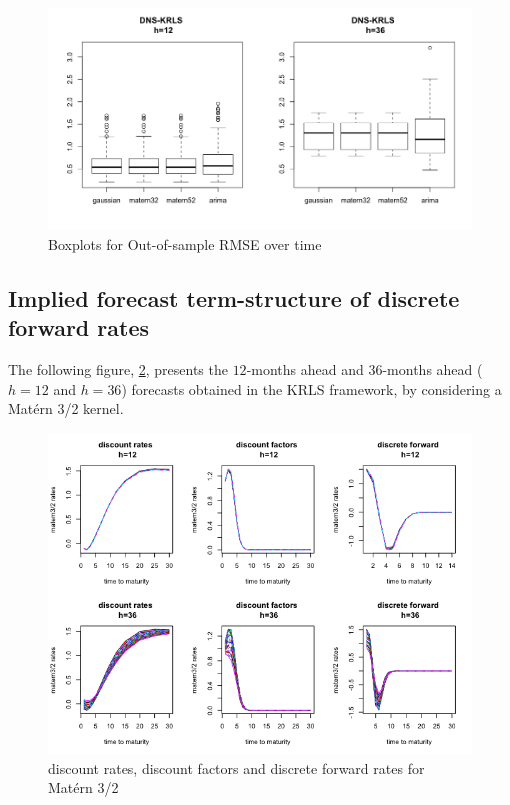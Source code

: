\begin{figure}[!htb]
\centering
\includegraphics[width=12cm]{gfx/chapter-krls-models/oos_rmse_dns_krls_2}
\caption{Boxplots for Out-of-sample RMSE over time}
\label{oos_rmse_dns_krls_2}
\end{figure}

\newpage

\subsection{Implied forecast term-structure of discrete forward rates}
\label{sec:fcast_curves}

The following figure, \ref{fcast_matern32}, presents the $12$-months ahead and $36$-months ahead ($h = 12$ and $h = 36$) forecasts obtained in the KRLS framework, by considering a Mat\'ern 3/2 kernel. 

\begin{figure}[!htb]
\centering
\includegraphics[width=12.5cm]{gfx/chapter-krls-models/fcast_matern32}
\caption{discount rates, discount factors and discrete forward rates for Mat\'ern 3/2}
\label{fcast_matern32}
\end{figure}

